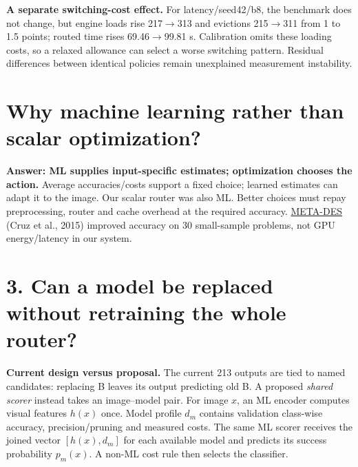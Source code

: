 \documentclass[10pt,a4paper]{article}
\begin{document}
\textbf{A separate switching-cost effect.} For latency/seed42/b8, the benchmark does not change, but engine loads rise 217$\to$313 and evictions 215$\to$311 from 1 to 1.5 points; routed time rises 69.46$\to$99.81 s. Calibration omits these loading costs, so a relaxed allowance can select a worse switching pattern. Residual differences between identical policies remain unexplained measurement instability.

\section*{Why machine learning rather than scalar optimization?}
\textbf{Answer: ML supplies input-specific estimates; optimization chooses the action.} Average accuracies/costs support a fixed choice; learned estimates can adapt it to the image. Our scalar router was also ML. Better choices must repay preprocessing, router and cache overhead at the required accuracy. \href{https://arxiv.org/abs/1810.01270}{META-DES} (Cruz et al., 2015) improved accuracy on 30 small-sample problems, not GPU energy/latency in our system.
\begin{center}
\end{center}

\section*{3. Can a model be replaced without retraining the whole router?}
\textbf{Current design versus proposal.} The current 213 outputs are tied to named candidates: replacing B leaves its output predicting old B. A proposed \emph{shared scorer} instead takes an image--model pair. For image $x$, an ML encoder computes visual features $h(x)$ once. Model profile $d_m$ contains validation class-wise accuracy, precision/pruning and measured costs. The same ML scorer receives the joined vector $[h(x),d_m]$ for each available model and predicts its success probability $p_m(x)$. A non-ML cost rule then selects the classifier.
\end{document}
